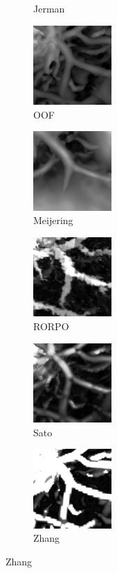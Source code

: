 \begin{figure}[H]
\begin{subfigure}[t]{0.30\textwidth}
        \caption{Jerman}
      \end{subfigure}
      \begin{subfigure}[t]{0.30\textwidth}
        \includegraphics[clip = true, trim  = 0 50 0 80, width=30mm]{Images/Ircad_k_OOF_GM.png}
        \caption{OOF}
      \end{subfigure}
      \begin{subfigure}[t]{0.30\textwidth}
        \includegraphics[clip = true, trim  = 0 50 0 80, width=30mm]{Images/Ircad_k_Meijering.png}
        \caption{Meijering}
      \end{subfigure}
      \begin{subfigure}[t]{0.30\textwidth}
        \includegraphics[clip = true, trim  = 0 50 0 80, width=30mm]{Images/Ircad_k_RORPO.png}
        \caption{RORPO}
      \end{subfigure}
      \begin{subfigure}[t]{0.30\textwidth}
        \includegraphics[clip = true, trim  = 0 50 0 80, width=30mm]{Images/Ircad_k_Sato.png}
        \caption{Sato}
      \end{subfigure}
      \begin{subfigure}[t]{0.30\textwidth}
        \includegraphics[clip = true, trim  = 0 50 0 80, width=30mm]{Images/Ircad_k_Zhang.png}
        \caption{Zhang}
      \end{subfigure}


\end{figure}
